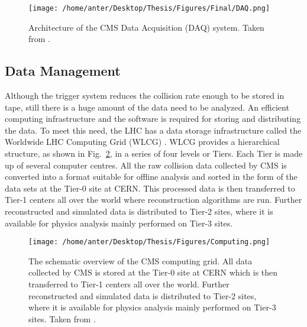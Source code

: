 \begin{figure}[!h]
\begin{center}
\vspace*{1mm} 
\hspace*{-5mm}
\texttt{[image: /home/anter/Desktop/Thesis/Figures/Final/DAQ.png]}\\
\vspace*{2mm}
\caption[Architecture of the CMS Data Acquisition (DAQ) system.]{Architecture of the CMS Data Acquisition (DAQ) system. Taken from \cite{Chatrchyan:2008aa}.}
\label{fig:DAQ}
\end{center}
\end{figure}

\subsection{Data Management}
Although the trigger system reduces the collision rate enough to be stored in tape, still there is a huge amount of the data need to be analyzed. An efficient computing infrastructure and the software is required for storing and distributing the data. To meet this need, the LHC has a data storage infrastructure called the Worldwide LHC Computing Grid (WLCG) \cite{Bird:2005js}. WLCG provides a hierarchical structure, as shown in Fig.~\ref{fig:Computing}, in a series of four levels or Tiers. Each Tier is made up of several computer centres. All the raw collision data collected by CMS is converted into a format suitable for offline analysis and sorted in the form of the data sets at the Tier-0 site at CERN. This processed data is then transferred to Tier-1 centers all over the world where reconstruction algorithms are run. Further reconstructed and simulated data is distributed to Tier-2 sites, where it is available for physics analysis mainly performed on Tier-3 sites. %

\begin{figure}[!h]
\begin{center}
\vspace*{3mm} 
\hspace*{-5mm}
\texttt{[image: /home/anter/Desktop/Thesis/Figures/Computing.png]}\\
\vspace*{4mm}
\caption[The schematic overview of the CMS computing grid.]{The schematic overview of the CMS computing grid. All data collected by CMS is stored at the Tier-0 site at CERN which is then transferred to Tier-1 centers all over the world. Further reconstructed and simulated data is distributed to Tier-2 sites, where it is available for physics analysis mainly performed on Tier-3 sites. Taken from \cite{Bird:2005js}.}
\label{fig:Computing}
\end{center}
\end{figure}

